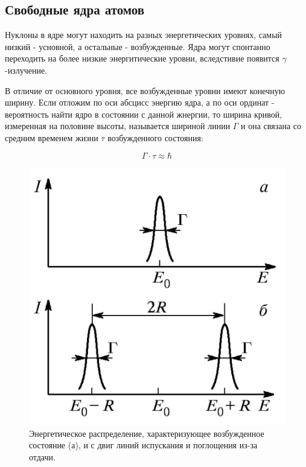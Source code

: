 \documentclass[a4paper]{article}
\begin{document}
\subsection{Свободные ядра атомов}

Нуклоны в ядре могут находить на разных энергетических уровнях, самый низкий - усновной, а остальные - возбужденные. 
Ядра могут спонтанно переходить на более низкие энергитические уровни, вследстивие появится $\gamma$-излучение. \par 

В отличие от основного уровня, все возбужденные уровни имеют конечную ширину. Если отложим по оси абсцисс энергию ядра, а по оси ординат - 
вероятность найти ядро в состоянии с данной жнергии, то ширина кривой, измеренная на половине высоты, называется шириной линии $\Gamma$ и она 
связана со средним временем жизни $\tau$ возбужденного состояния:

\begin{equation}
    \Gamma \cdot \tau \approx \hbar 
\end{equation}

\begin{figure}
    \includegraphics[scale = 0.5]{p1.png}
    \caption{Энергетическое распределение, характеризующее возбужденное состояние (а), и с двиг линий испускания и поглощения из-за отдачи.}
    \label{p1}
\end{figure}
\end{document}
